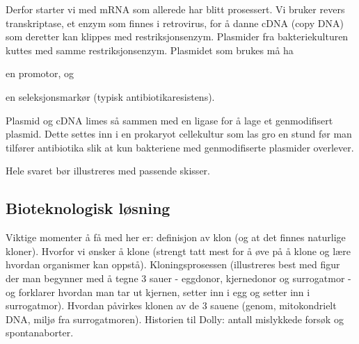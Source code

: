 Derfor starter vi med mRNA som allerede har blitt prosessert. Vi bruker revers transkriptase, et enzym som finnes i retrovirus, for å danne cDNA (copy DNA) som deretter kan klippes med restriksjonsenzym. Plasmider fra bakteriekulturen kuttes med samme restriksjonsenzym. Plasmidet som brukes må ha 
\begin{inparaenum}[(i)]
	\item en promotor, og
	\item en seleksjonsmarkør (typisk antibiotikaresistens).
\end{inparaenum}
Plasmid og cDNA limes så sammen med en ligase for å lage et genmodifisert plasmid. Dette settes inn i en prokaryot cellekultur som las gro en stund før man tilfører antibiotika slik at kun bakteriene med genmodifiserte plasmider overlever.

Hele svaret bør illustreres med passende skisser.

\subsection{Bioteknologisk løsning}

Viktige momenter å få med her er: definisjon av klon (og at det finnes naturlige kloner). Hvorfor vi ønsker å klone (strengt tatt mest for å øve på å klone og lære hvordan organismer kan oppstå). Kloningsprosessen (illustreres best med figur der man begynner med å tegne 3 sauer - eggdonor, kjernedonor og surrogatmor - og forklarer hvordan man tar ut kjernen, setter inn i egg og setter inn i surrogatmor). Hvordan påvirkes klonen av de 3 sauene (genom, mitokondrielt DNA, miljø fra surrogatmoren). Historien til Dolly: antall mislykkede forsøk og spontanaborter. 